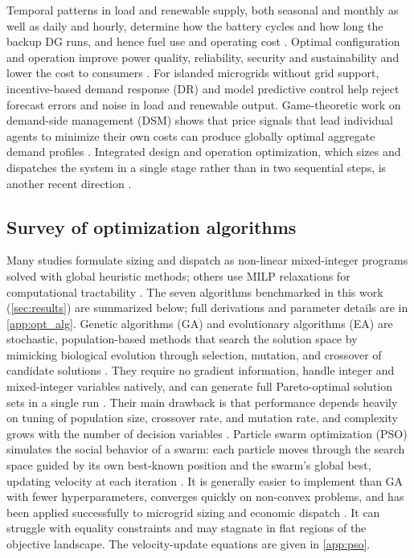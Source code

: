 \documentclass[final,3p,times]{elsarticle}
\begin{document}
Temporal patterns in load and renewable supply, both seasonal and monthly as well as daily and hourly, determine how the battery cycles and how long the backup DG runs, and hence fuel use and operating cost \cite{tazvinga2013}. Optimal configuration and operation improve power quality, reliability, security and sustainability and lower the cost to consumers \cite{pathak2017}. For islanded microgrids without grid support, incentive-based demand response (DR) \cite{nwulu2017} and model predictive control \cite{zachar2016} help reject forecast errors and noise in load and renewable output. Game-theoretic work on demand-side management (DSM) shows that price signals that lead individual agents to minimize their own costs can produce globally optimal aggregate demand profiles \cite{paola2017}. Integrated design and operation optimization, which sizes and dispatches the system in a single stage rather than in two sequential steps, is another recent direction \cite{moshi2016}.

\subsection{Survey of optimization algorithms}

Many studies formulate sizing and dispatch as non-linear mixed-integer programs solved with global heuristic methods; others use MILP relaxations for computational tractability \cite{parisio2014, Qu2018}. The seven algorithms benchmarked in this work (\cref{sec:results}) are summarized below; full derivations and parameter details are in \cref{app:opt_alg}. Genetic algorithms (GA) and evolutionary algorithms (EA) are stochastic, population-based methods that search the solution space by mimicking biological evolution through selection, mutation, and crossover of candidate solutions \cite{nemati2015}. They require no gradient information, handle integer and mixed-integer variables natively, and can generate full Pareto-optimal solution sets in a single run \cite{fadaee2012}. Their main drawback is that performance depends heavily on tuning of population size, crossover rate, and mutation rate, and complexity grows with the number of decision variables \cite{fathima2015}. Particle swarm optimization (PSO) simulates the social behavior of a swarm: each particle moves through the search space guided by its own best-known position and the swarm's global best, updating velocity at each iteration \cite{fathima2015, pathak2017}. It is generally easier to implement than GA with fewer hyperparameters, converges quickly on non-convex problems, and has been applied successfully to microgrid sizing and economic dispatch \cite{alrashidi2010}. It can struggle with equality constraints and may stagnate in flat regions of the objective landscape. The velocity-update equations are given in \cref{app:pso}.
\end{document}
